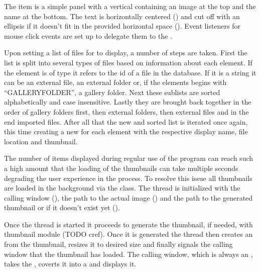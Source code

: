 \begin{sloppypar}
The item is a simple panel with a vertical  containing an
image at the top and the name at the bottom. The text is horizontally centered
() and cut off with an ellipsis if it
doesn't fit in the provided horizontal space (). Event listeners for mouse click events are set up to
delegate them to the .
\end{sloppypar}

Upon setting a list of files for  to display, a number of
steps are taken. First the list is split into several types of files based on
information about each element. If the element is of type  it
refers to the id of a file in the database. If it is a string it can be an
external file, an external folder or, if the elements begins with
``GALLERYFOLDER'', a gallery folder. Next these sublists are sorted
alphabetically and case insensitive. Lastly they are brought back together in
the order of gallery folders first, then external folders, then external files
and in the end imported files. After all that the new and sorted list is
iterated once again, this time creating a new  for each element
with the respective display name, file location and thumbnail.

The number of items displayed during regular use of the program can reach such
a high amount that the loading of the thumbnails can take multiple seconds
degrading the user experience in the process. To resolve this issue all
thumbnails are loaded in the background via the  class.
The thread is initialized with the calling window (), the
path to the actual image () and the path to the generated
thumbnail or  if it doesn't exist yet ().

Once the thread is started it proceeds to generate the thumbnail, if needed,
with thumbnail module (TODO cref). Once it is generated the thread then creates
an  from the thumbnail, resizes it to desired size and finally
signals the calling window that the thumbnail has loaded. The calling window,
which is always an , takes the , coverts it into a
 and displays it.
